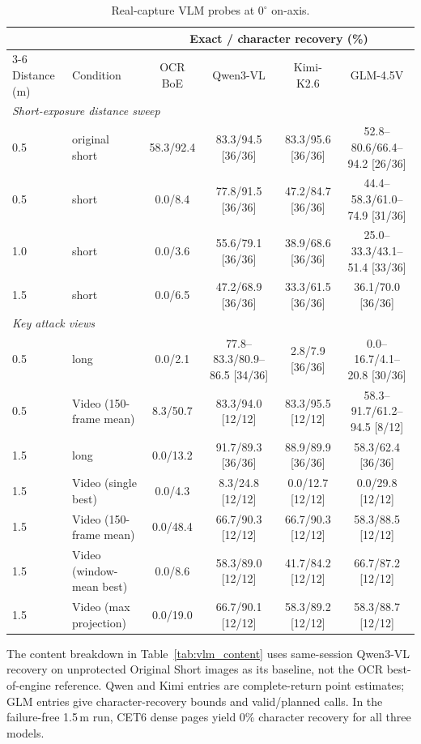 \documentclass{ieeeaccess}
\begin{document}
\begin{table}[!t]
\caption{Real-capture VLM probes at $0^{\circ}$ on-axis.}
\label{tab:real_vlm}
\centering
\scriptsize
\setlength{\tabcolsep}{2.0pt}
{\renewcommand{\arraystretch}{1.12}
\begin{tabular*}{\textwidth}{@{\extracolsep{\fill}}llcccc@{}}
\toprule
& & \multicolumn{4}{c}{Exact / character recovery (\%)} \\
\cmidrule(lr){3-6}
Distance (m) & Condition & OCR BoE & Qwen3-VL & Kimi-K2.6 & GLM-4.5V \\
\midrule
\multicolumn{6}{l}{\textit{Short-exposure distance sweep}}\\
\midrule
0.5 & original short & 58.3/92.4 & 83.3/94.5 [36/36] & 83.3/95.6 [36/36] & 52.8--80.6/66.4--94.2 [26/36] \\
0.5 & short & 0.0/8.4 & 77.8/91.5 [36/36] & 47.2/84.7 [36/36] & 44.4--58.3/61.0--74.9 [31/36] \\
1.0 & short & 0.0/3.6 & 55.6/79.1 [36/36] & 38.9/68.6 [36/36] & 25.0--33.3/43.1--51.4 [33/36] \\
1.5 & short & 0.0/6.5 & 47.2/68.9 [36/36] & 33.3/61.5 [36/36] & 36.1/70.0 [36/36] \\
\midrule
\multicolumn{6}{l}{\textit{Key attack views}}\\
\midrule
0.5 & long & 0.0/2.1 & 77.8--83.3/80.9--86.5 [34/36] & 2.8/7.9 [36/36] & 0.0--16.7/4.1--20.8 [30/36] \\
0.5 & Video (150-frame mean) & 8.3/50.7 & 83.3/94.0 [12/12] & 83.3/95.5 [12/12] & 58.3--91.7/61.2--94.5 [8/12] \\
1.5 & long & 0.0/13.2 & 91.7/89.3 [36/36] & 88.9/89.9 [36/36] & 58.3/62.4 [36/36] \\
1.5 & Video (single best) & 0.0/4.3 & 8.3/24.8 [12/12] & 0.0/12.7 [12/12] & 0.0/29.8 [12/12] \\
1.5 & Video (150-frame mean) & 0.0/48.4 & 66.7/90.3 [12/12] & 66.7/90.3 [12/12] & 58.3/88.5 [12/12] \\
1.5 & Video (window-mean best) & 0.0/8.6 & 58.3/89.0 [12/12] & 41.7/84.2 [12/12] & 66.7/87.2 [12/12] \\
1.5 & Video (max projection) & 0.0/19.0 & 66.7/90.1 [12/12] & 58.3/89.2 [12/12] & 58.3/88.7 [12/12] \\
\bottomrule
\end{tabular*}
}
\end{table}

The content breakdown in Table~\ref{tab:vlm_content} uses same-session Qwen3-VL recovery on unprotected Original Short images as its baseline, not the OCR best-of-engine reference. Qwen and Kimi entries are complete-return point estimates; GLM entries give character-recovery bounds and valid/planned calls. In the failure-free 1.5\,m run, CET6 dense pages yield 0\% character recovery for all three models.
\end{document}
